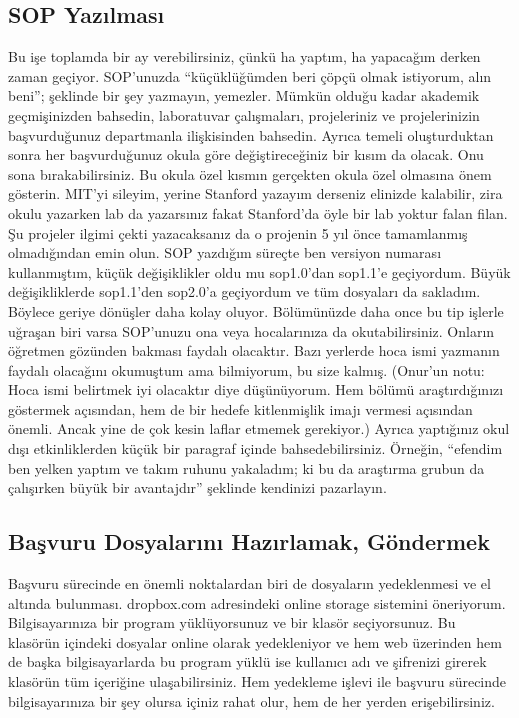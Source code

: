 \documentclass[12pt]{article}
\begin{document}
\subsection{SOP Yazılması}
Bu işe toplamda bir ay verebilirsiniz, çünkü ha yaptım, ha yapacağım derken zaman geçiyor. SOP'unuzda ``küçüklüğümden beri çöpçü olmak istiyorum, alın beni''; şeklinde bir şey yazmayın, yemezler. Mümkün olduğu kadar akademik geçmişinizden bahsedin, laboratuvar çalışmaları, projeleriniz ve projelerinizin başvurduğunuz departmanla ilişkisinden bahsedin. Ayrıca temeli oluşturduktan sonra her başvurduğunuz okula göre değiştireceğiniz bir kısım da olacak. Onu sona bırakabilirsiniz. Bu okula özel kısmın gerçekten okula özel olmasına önem gösterin. MIT'yi sileyim, yerine Stanford yazayım derseniz elinizde kalabilir, zira okulu yazarken lab da yazarsınız fakat Stanford'da öyle bir lab yoktur falan filan. Şu projeler ilgimi çekti yazacaksanız da o projenin 5 yıl önce tamamlanmış olmadığından emin olun. SOP yazdığım süreçte ben versiyon numarası kullanmıştım, küçük değişiklikler oldu mu sop1.0’dan sop1.1’e geçiyordum. Büyük değişikliklerde sop1.1’den sop2.0’a geçiyordum ve tüm dosyaları da sakladım. Böylece geriye dönüşler daha kolay oluyor. Bölümünüzde daha once bu tip işlerle uğraşan biri varsa SOP'unuzu ona veya hocalarınıza da okutabilirsiniz. Onların öğretmen gözünden bakması faydalı olacaktır. Bazı yerlerde hoca ismi yazmanın faydalı olacağını okumuştum ama bilmiyorum, bu size kalmış. (Onur'un notu: Hoca ismi belirtmek iyi olacaktır diye düşünüyorum. Hem bölümü araştırdığınızı göstermek açısından, hem de bir hedefe kitlenmişlik imajı vermesi açısından önemli. Ancak yine de çok kesin laflar etmemek gerekiyor.) Ayrıca yaptığınız okul dışı etkinliklerden küçük bir paragraf içinde bahsedebilirsiniz. Örneğin, ``efendim ben yelken yaptım ve takım ruhunu yakaladım; ki bu da araştırma grubun da çalışırken büyük bir avantajdır'' şeklinde  kendinizi pazarlayın. 

\subsection{Başvuru Dosyalarını Hazırlamak, Göndermek}
Başvuru sürecinde en önemli noktalardan biri de dosyaların yedeklenmesi ve el altında bulunması. dropbox.com adresindeki online storage sistemini öneriyorum. Bilgisayarınıza bir program yüklüyorsunuz ve bir klasör seçiyorsunuz. Bu klasörün içindeki dosyalar online olarak yedekleniyor ve hem web üzerinden hem de başka bilgisayarlarda bu program yüklü ise kullanıcı adı ve şifrenizi girerek klasörün tüm içeriğine ulaşabilirsiniz. Hem yedekleme işlevi ile başvuru sürecinde bilgisayarınıza bir şey olursa içiniz rahat olur, hem de her yerden erişebilirsiniz. 
\end{document}
